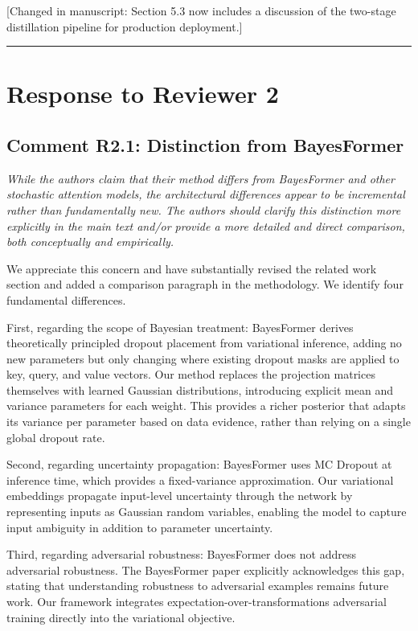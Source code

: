 \documentclass[12pt,a4paper]{article}
\newcommand{\reviewertext}[1]{\textcolor{reviewercolor}{\textit{#1}}}
\newcommand{\response}[1]{\textcolor{responsecolor}{#1}}
\newcommand{\changed}[1]{\textcolor{changecolor}{[Changed in manuscript: #1]}}
\begin{document}
\changed{Section 5.3 now includes a discussion of the two-stage distillation pipeline for production deployment.}

\bigskip
\hrule
\bigskip

\section*{Response to Reviewer 2}

\subsection*{Comment R2.1: Distinction from BayesFormer}

\reviewertext{While the authors claim that their method differs from BayesFormer and other stochastic attention models, the architectural differences appear to be incremental rather than fundamentally new. The authors should clarify this distinction more explicitly in the main text and/or provide a more detailed and direct comparison, both conceptually and empirically.}

\bigskip

\response{We appreciate this concern and have substantially revised the related work section and added a comparison paragraph in the methodology. We identify four fundamental differences.}

\response{First, regarding the scope of Bayesian treatment: BayesFormer derives theoretically principled dropout placement from variational inference, adding no new parameters but only changing where existing dropout masks are applied to key, query, and value vectors. Our method replaces the projection matrices themselves with learned Gaussian distributions, introducing explicit mean and variance parameters for each weight. This provides a richer posterior that adapts its variance per parameter based on data evidence, rather than relying on a single global dropout rate.}

\response{Second, regarding uncertainty propagation: BayesFormer uses MC Dropout at inference time, which provides a fixed-variance approximation. Our variational embeddings propagate input-level uncertainty through the network by representing inputs as Gaussian random variables, enabling the model to capture input ambiguity in addition to parameter uncertainty.}

\response{Third, regarding adversarial robustness: BayesFormer does not address adversarial robustness. The BayesFormer paper explicitly acknowledges this gap, stating that understanding robustness to adversarial examples remains future work. Our framework integrates expectation-over-transformations adversarial training directly into the variational objective.}
\end{document}
